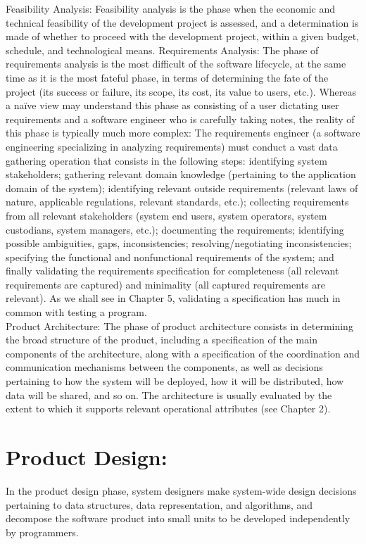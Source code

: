 Feasibility Analysis: Feasibility analysis is the phase when the economic and technical feasibility of the development project is assessed, and a determination is made of whether to proceed with the development project, within a given budget, schedule, and technological means.
Requirements Analysis: The phase of requirements analysis is the most difficult of the software lifecycle, at the same time as it is the most fateful phase, in terms of determining the fate of the project (its success or failure, its scope, its cost, its value to users, etc.). Whereas a naïve view may understand this phase as consisting of a user dictating user requirements and a software engineer who is carefully taking notes, the reality of this phase is typically much more complex: The requirements engineer (a software engineering specializing in analyzing requirements) must conduct a vast data gathering operation that consists in the following steps: identifying system stakeholders; gathering relevant domain knowledge (pertaining to the application domain of the system); identifying relevant outside requirements (relevant laws of nature, applicable regulations, relevant standards, etc.); collecting requirements from all relevant stakeholders (system end users, system operators, system custodians, system managers, etc.); documenting the requirements; identifying possible ambiguities, gaps, inconsistencies; resolving/negotiating inconsistencies; specifying the functional and nonfunctional requirements of the system; and finally validating the requirements specification for completeness (all relevant requirements are captured) and minimality (all captured requirements are relevant). As we shall see in Chapter 5, validating a specification has much in common with testing a program.
\\
Product Architecture: The phase of product architecture consists in determining the broad structure of the product, including a specification of the main components of the architecture, along with a specification of the coordination and communication mechanisms between the components, as well as decisions pertaining to how the system will be deployed, how it will be distributed, how data will be shared, and so on. The architecture is usually evaluated by the extent to which it supports relevant operational attributes (see Chapter 2).

\section{Product Design:} 
In the product design phase, system designers make system-wide design decisions pertaining to data structures, data representation, and algorithms, and decompose the software product into small units to be developed independently by programmers. 

